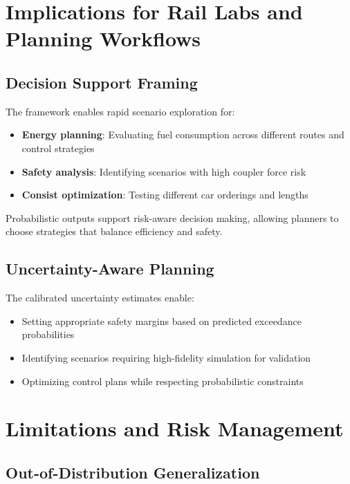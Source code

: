 \section{Implications for Rail Labs and Planning Workflows}

\subsection{Decision Support Framing}

The framework enables rapid scenario exploration for:
\begin{itemize}
    \item \textbf{Energy planning}: Evaluating fuel consumption across different routes and control strategies
    \item \textbf{Safety analysis}: Identifying scenarios with high coupler force risk
    \item \textbf{Consist optimization}: Testing different car orderings and lengths
\end{itemize}

Probabilistic outputs support risk-aware decision making, allowing planners to choose strategies that balance efficiency and safety.


\subsection{Uncertainty-Aware Planning}

The calibrated uncertainty estimates enable:
\begin{itemize}
    \item Setting appropriate safety margins based on predicted exceedance probabilities
    \item Identifying scenarios requiring high-fidelity simulation for validation
    \item Optimizing control plans while respecting probabilistic constraints
\end{itemize}


\section{Limitations and Risk Management}

\subsection{Out-of-Distribution Generalization}

